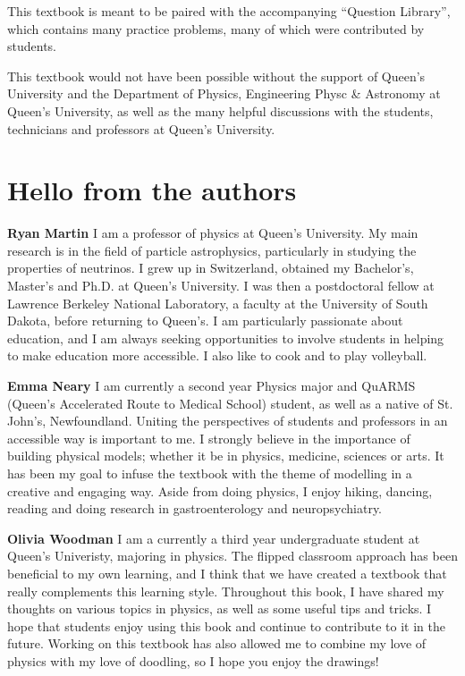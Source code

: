This textbook is meant to be paired with the accompanying ``Question Library'', which contains many practice problems, many of which were contributed by students. 

This textbook would not have been possible without the support of Queen's University and the Department of Physics, Engineering Physc \& Astronomy at Queen's University, as well as the many helpful discussions with the students, technicians and professors at Queen's University.

\section*{Hello from the authors}
\textbf{Ryan Martin} I am a professor of physics at Queen's University. My main research is in the field of particle astrophysics, particularly in studying the properties of neutrinos. I grew up in Switzerland, obtained my Bachelor's, Master's and Ph.D. at Queen's University. I was then a postdoctoral fellow at Lawrence Berkeley National Laboratory, a faculty at the University of South Dakota, before returning to Queen's. I am particularly passionate about education, and I am always seeking opportunities to involve students in helping to make education more accessible. I also like to cook and to play volleyball.

\textbf{Emma Neary} I am currently a second year Physics major and QuARMS (Queen's Accelerated Route to Medical School) student, as well as a native of St. John's, Newfoundland. Uniting the perspectives of students and professors in an accessible way is important to me. I strongly believe in the importance of building physical models; whether it be in physics, medicine, sciences or arts. It has been my goal to infuse the textbook with the theme of modelling in a creative and engaging way. Aside from doing physics, I enjoy hiking, dancing, reading and doing research in gastroenterology and neuropsychiatry.  

\textbf{Olivia Woodman} I am a currently a third year undergraduate student at Queen's Univeristy, majoring in physics. The flipped classroom approach has been beneficial to my own learning, and I think that we have created a textbook that really complements this learning style. Throughout this book, I have shared my thoughts on various topics in physics, as well as some useful tips and tricks. I hope that students enjoy using this book and continue to contribute to it in the future. Working on this textbook has also allowed me to combine my love of physics with my love of doodling, so I hope you enjoy the drawings!

